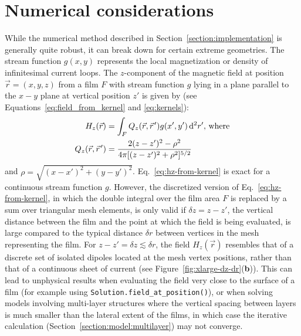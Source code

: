 \documentclass[final,3p,times,twocolumn]{elsarticle}
\newcommand{\pvec}[1]{\vec{#1}\mkern2mu\vphantom{#1}}
\newcommand{\inline}[1]{\texttt{#1}\xspace}
\begin{document}
\section{Numerical considerations}
\label{appendix:numerics}
While the numerical method described in Section~\ref{section:implementation} is generally quite robust, it can break down for certain extreme geometries. The stream function $g(x, y)$ represents the local magnetization or density of infinitesimal current loops. The $z$-component of the magnetic field at position $\vec{r}=(x, y, z)$ from a film $F$ with stream function $g$ lying in a plane parallel to the $x-y$ plane at vertical position $z'$ is given by (see Equations~\ref{eq:field_from_kernel} and \ref{eq:kernels}):
\begin{align}
\label{eq:hz-from-kernel}
\begin{split}
    H_z(\vec{r}) &= \int_F Q_z(\vec{r},\pvec{r}')g(x', y')\,\mathrm{d}^2r',\,\text{where}\\
    Q_z(\vec{r}, \pvec{r}') &=  \frac{2(z-z')^2-\rho^2}
            {4\pi[(z-z')^2+\rho^2]^{5/2}}
\end{split}
\end{align}
and $\rho=\sqrt{(x-x')^2+(y-y')^2}$. Eq.~\ref{eq:hz-from-kernel} is exact for a continuous stream function $g$. However, the discretized version of Eq.~\ref{eq:hz-from-kernel}, in which the double integral over the film area $F$ is replaced by a sum over triangular mesh elements, is only valid if $\delta z = z-z'$, the vertical distance between the film and the point at which the field is being evaluated, is large compared to the typical distance $\delta r$ between vertices in the mesh representing the film. For $z-z'=\delta z\lesssim\delta r$, the field $H_z(\vec{r})$ resembles that of a discrete set of isolated dipoles located at the mesh vertex positions, rather than that of a continuous sheet of current (see Figure~\ref{fig:xlarge-dz-dr}({\bf b})). This can lead to unphysical results when evaluating the field very close to the surface of a film (for example using \inline{Solution.field_at_position()}), or when solving models involving multi-layer structures where the vertical spacing between layers is much smaller than the lateral extent of the films, in which case the iterative calculation (Section~\ref{section:model:multilayer}) may not converge.
\end{document}
